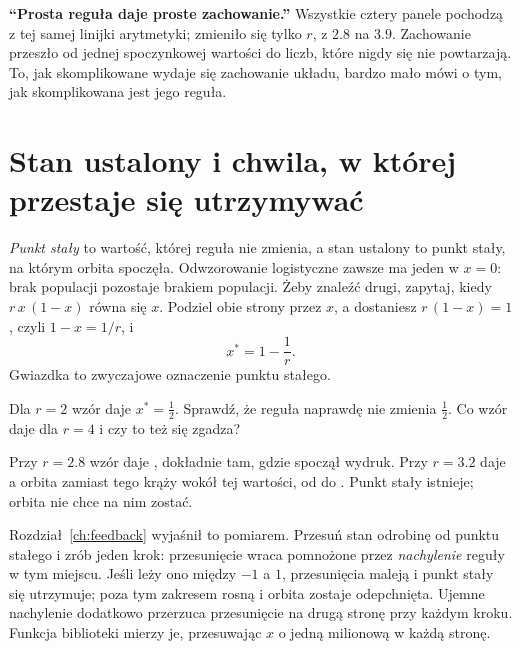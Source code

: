 
\begin{trapbox}
\textbf{\enquote{Prosta reguła daje proste zachowanie.}} Wszystkie cztery
panele pochodzą z tej samej linijki arytmetyki; zmieniło się tylko $r$, z
$\num{2.8}$ na $\num{3.9}$. Zachowanie przeszło od jednej spoczynkowej
wartości do liczb, które nigdy się nie powtarzają. To, jak skomplikowane
wydaje się zachowanie układu, bardzo mało mówi o tym, jak skomplikowana jest
jego reguła.
\end{trapbox}

\section{Stan ustalony i chwila, w której przestaje się utrzymywać}
\label{sec:ch05-fixed}

\noindent
\emph{Punkt stały} to wartość, której reguła nie zmienia, a stan ustalony
to punkt stały, na którym orbita spoczęła. Odwzorowanie logistyczne zawsze
ma jeden w $x = 0$: brak populacji pozostaje brakiem populacji. Żeby
znaleźć drugi, zapytaj, kiedy $r\,x\,(1 - x)$ równa się $x$. Podziel obie
strony przez $x$, a dostaniesz $r\,(1 - x) = 1$, czyli $1 - x = 1/r$, i
\[ x^{*} = 1 - \frac{1}{r}. \]
Gwiazdka to zwyczajowe oznaczenie punktu stałego.

\begin{think}
Dla $r = 2$ wzór daje $x^{*} = \tfrac12$. Sprawdź, że reguła naprawdę nie
zmienia $\tfrac12$. Co wzór daje dla $r = 4$ i czy to też się zgadza?
\end{think}

\noindent
Przy $r = \num{2.8}$ wzór daje , dokładnie tam, gdzie
spoczął wydruk. Przy $r = \num{3.2}$ daje  \dash{} a orbita
zamiast tego krąży wokół tej wartości, od  do
. Punkt stały istnieje; orbita nie chce na nim zostać.

Rozdział~\ref{ch:feedback} wyjaśnił to pomiarem. Przesuń stan odrobinę od
punktu stałego i zrób jeden krok: przesunięcie wraca pomnożone przez
\emph{nachylenie} reguły w tym miejscu. Jeśli leży ono między $-1$ a $1$,
przesunięcia maleją i punkt stały się utrzymuje; poza tym zakresem rosną i
orbita zostaje odepchnięta. Ujemne nachylenie dodatkowo przerzuca
przesunięcie na drugą stronę przy każdym kroku. Funkcja biblioteki
 mierzy je, przesuwając $x$ o jedną milionową w każdą stronę.

